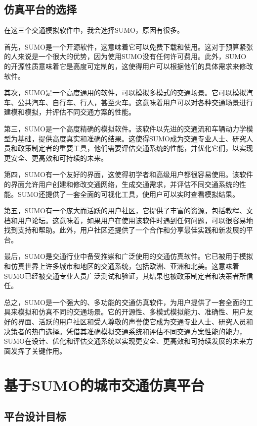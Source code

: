 \subsection{仿真平台的选择}

在这三个交通模拟软件中，我会选择SUMO，原因有很多。

首先，SUMO是一个开源软件，这意味着它可以免费下载和使用。这对于预算紧张的人来说是一个很大的优势，因为使用SUMO没有任何许可费用。此外，SUMO的开源性质意味着它是高度可定制的，这使得用户可以根据他们的具体需求来修改软件。

其次，SUMO是一个高度通用的软件，可以模拟多模式的交通场景。它可以模拟汽车、公共汽车、自行车、行人，甚至火车。这意味着用户可以对各种交通场景进行建模和模拟，并评估不同交通方案的性能。

第三，SUMO是一个高度精确的模拟软件。该软件以先进的交通流和车辆动力学模型为基础，提供高度真实和准确的结果。这使得SUMO成为交通专业人士、研究人员和政策制定者的重要工具，他们需要评估交通系统的性能，并优化它们，以实现更安全、更高效和可持续的未来。

第四，SUMO有一个友好的界面，这使得初学者和高级用户都很容易使用。该软件的界面允许用户创建和修改交通网络，生成交通需求，并评估不同交通系统的性能。SUMO还提供了一套全面的可视化工具，使用户可以实时查看模拟结果。

第五，SUMO有一个庞大而活跃的用户社区，它提供了丰富的资源，包括教程、文档和用户论坛。这意味着，如果用户在使用该软件时遇到任何问题，可以很容易地找到支持和帮助。此外，用户社区还提供了一个合作和分享最佳实践和新发展的平台。

最后，SUMO是交通行业中备受推崇和广泛使用的交通仿真软件。它已被用于模拟和仿真世界上许多城市和地区的交通系统，包括欧洲、亚洲和北美。这意味着SUMO已经被交通专业人员广泛测试和验证，其结果也被政策制定者和决策者所信任。

总之，SUMO是一个强大的、多功能的交通仿真软件，为用户提供了一套全面的工具来模拟和仿真不同的交通场景。它的开源性、多模式模拟能力、准确性、用户友好的界面、活跃的用户社区和受人尊敬的声誉使它成为交通专业人士、研究人员和决策者的热门选择。凭借其准确模拟交通系统和评估不同交通方案性能的能力，SUMO在设计、优化和评估交通系统以实现更安全、更高效和可持续发展的未来方面发挥了关键作用。

\section{基于SUMO的城市交通仿真平台}

\subsection{平台设计目标}

